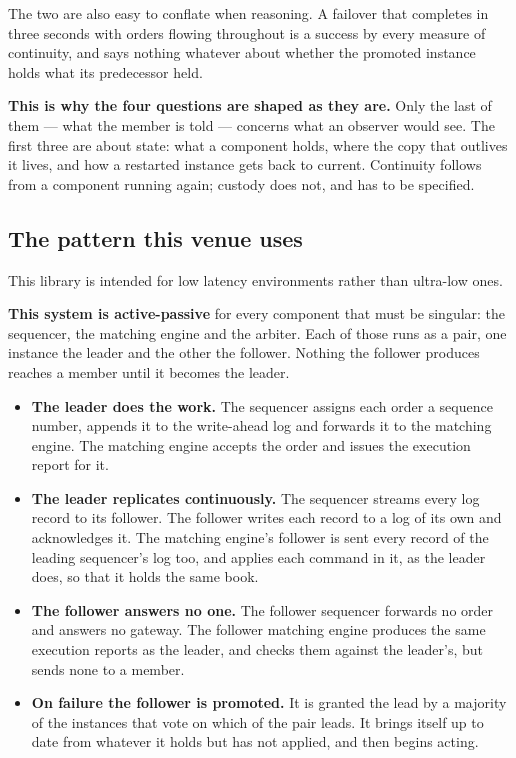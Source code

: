 The two are also easy to conflate when reasoning. A failover that completes in
three seconds with orders flowing throughout is a success by every measure of
continuity, and says nothing whatever about whether the promoted instance holds
what its predecessor held.

\textbf{This is why the four questions are shaped as they are.} Only the last of
them --- what the member is told --- concerns what an observer would see. The
first three are about state: what a component holds, where the copy that outlives
it lives, and how a restarted instance gets back to current. Continuity follows
from a component running again; custody does not, and has to be specified.

\subsection{The pattern this venue uses}
\label{subsec:ha_approach}

This library is intended for low latency environments rather than ultra-low ones.

\textbf{This system is active-passive} for every component that must be
singular: the sequencer, the matching engine and the arbiter. Each of those runs
as a pair, one instance the leader and the other the follower. Nothing the
follower produces reaches a member until it becomes the leader.

\begin{itemize}[nosep]
  \item \textbf{The leader does the work.} The sequencer assigns each order a
        sequence number, appends it to the write-ahead log and forwards it to the
        matching engine. The matching engine accepts the order and issues the
        execution report for it.
  \item \textbf{The leader replicates continuously.} The sequencer streams every
        log record to its follower. The follower writes each record to a log of
        its own and acknowledges it. The matching engine's follower is sent every
        record of the leading sequencer's log too, and applies each command in
        it, as the leader does, so that it holds the same book.
  \item \textbf{The follower answers no one.} The follower sequencer forwards no
        order and answers no gateway. The follower matching engine produces the
        same execution reports as the leader, and checks them against the
        leader's, but sends none to a member.
  \item \textbf{On failure the follower is promoted.} It is granted the lead by
        a majority of the instances that vote on which of the pair leads. It
        brings itself up to date from whatever it holds but has not applied, and
        then begins acting.
\end{itemize}

